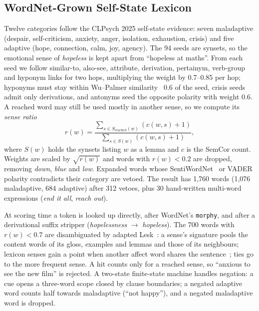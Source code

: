 \documentclass[conference]{IEEEtran}
\begin{document}
\subsection{WordNet-Grown Self-State Lexicon}
Twelve categories follow the CLPsych 2025 self-state evidence: seven maladaptive (despair, self-criticism, anxiety, anger, isolation, exhaustion, crisis) and five adaptive (hope, connection, calm, joy, agency). The 94 seeds are synsets, so the emotional sense of \emph{hopeless} is kept apart from ``hopeless at maths''. From each seed we follow similar-to, also-see, attribute, derivation, pertainym, verb-group and hyponym links for two hops, multiplying the weight by 0.7--0.85 per hop; hyponyms must stay within Wu--Palmer similarity~\cite{wu1994verb} 0.6 of the seed, crisis seeds admit only derivations, and antonyms seed the opposite polarity with weight 0.6. A reached word may still be used mostly in another sense, so we compute its \emph{sense ratio}
\begin{equation}
r(w) = \frac{\sum_{s \in S_{\text{reached}}(w)} (c(w,s)+1)}{\sum_{s \in S(w)} (c(w,s)+1)},
\end{equation}
where $S(w)$ holds the synsets listing $w$ as a lemma and $c$ is the SemCor count. Weights are scaled by $\sqrt{r(w)}$ and words with $r(w) < 0.2$ are dropped, removing \emph{down}, \emph{blue} and \emph{low}. Expanded words whose SentiWordNet~\cite{esuli2006sentiwordnet} or VADER polarity contradicts their category are vetoed. The result has 1,760 words (1,076 maladaptive, 684 adaptive) after 312 vetoes, plus 30 hand-written multi-word expressions (\emph{end it all}, \emph{reach out}).

At scoring time a token is looked up directly, after WordNet's \texttt{morphy}, and after a derivational suffix stripper (\emph{hopelessness} $\rightarrow$ \emph{hopeless}). The 700 words with $r(w) < 0.7$ are disambiguated by adapted Lesk~\cite{banerjee2002adapted}: a sense's signature pools the content words of its gloss, examples and lemmas and those of its neighbours; lexicon senses gain a point when another affect word shares the sentence~\cite{magnini2002role}; ties go to the more frequent sense. A hit counts only for a reached sense, so ``anxious to see the new film'' is rejected. A two-state finite-state machine handles negation: a cue opens a three-word scope closed by clause boundaries; a negated adaptive word counts half towards maladaptive (``not happy''), and a negated maladaptive word is dropped.
\end{document}

